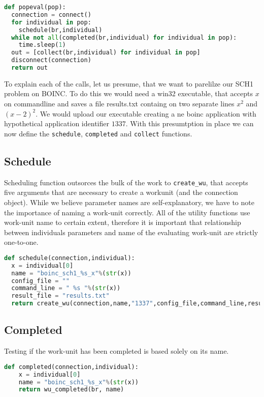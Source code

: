 \documentclass[12pt,oneside]{fithesis2}
\begin{document}
\begin{lstlisting}[language=Python,label=boinc_pop,caption=Boinc Evaluation]
def popeval(pop):
  connection = connect()
  for individual in pop:
    schedule(br,individual)
  while not all(completed(br,individual) for individual in pop):
    time.sleep(1)
  out = [collect(br,individual) for individual in pop]
  disconnect(connection)
  return out
\end{lstlisting} 
To explain each of the calls, let us presume, that we want to parelilze our SCH1 problem on BOINC. To do this we would need a win32 executable, that accepts $x$ on commandline and saves a file 
results.txt containg on two separate lines $x^2$ and $(x-2)^2$. We would upload our executable creating a ne boinc application with hypothetical application identifier $1337$. With this presumtption in place we can now define the \lstinline$schedule$, \lstinline$completed$ and \lstinline$collect$ functions.
\subsection{Schedule}
Scheduling function outsorces the bulk of the work to \lstinline$create_wu$, that accepts five arguments that are necessary to create a workunit (and the connection object). While we believe parameter names are self-explanatory, we have to note the importance of naming a work-unit correctly. All of the utility functions use work-unit name to certain extent, therefore it is important that relationship between individuals parameters and name of the evaluating work-unit are strictly one-to-one.

\begin{lstlisting}[language=Python,label=boinc_pop,caption=Boinc Evaluation]
def schedule(connection,individual):
  x = individual[0]
  name = "boinc_sch1_%s_x"%(str(x))
  config_file = ""
  command_line = " %s "%(str(x))
  result_file = "results.txt"  
  return create_wu(connection,name,"1337",config_file,command_line,result_file)
\end{lstlisting} 

\subsection{Completed}
Testing if the work-unit has been completed is based solely on its name.

\begin{lstlisting}[language=Python,label=boinc_pop,caption=Boinc Evaluation]
def completed(connection,individual):
    x = individual[0]
    name = "boinc_sch1_%s_x"%(str(x))
    return wu_completed(br, name)
\end{lstlisting} 
\end{document}

